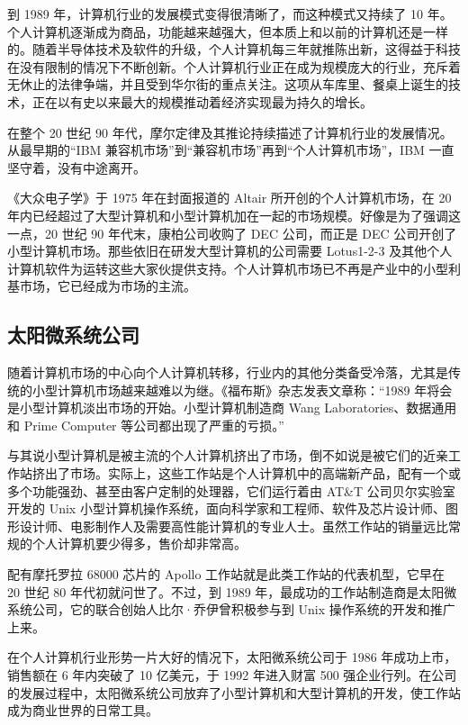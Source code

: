\documentclass[12pt,UTF8]{ctexbook}
\begin{document}
到 1989 年，计算机行业的发展模式变得很清晰了，而这种模式又持续了 10 年。个人计算机逐渐成为商品，功能越来越强大，但本质上和以前的计算机还是一样的。随着半导体技术及软件的升级，个人计算机每三年就推陈出新，这得益于科技在没有限制的情况下不断创新。个人计算机行业正在成为规模庞大的行业，充斥着无休止的法律争端，并且受到华尔街的重点关注。这项从车库里、餐桌上诞生的技术，正在以有史以来最大的规模推动着经济实现最为持久的增长。

在整个 20 世纪 90 年代，摩尔定律及其推论持续描述了计算机行业的发展情况。从最早期的“IBM 兼容机市场”到“兼容机市场”再到“个人计算机市场”，IBM 一直坚守着，没有中途离开。

《大众电子学》于 1975 年在封面报道的 Altair 所开创的个人计算机市场，在 20 年内已经超过了大型计算机和小型计算机加在一起的市场规模。好像是为了强调这一点，20 世纪 90 年代末，康柏公司收购了 DEC 公司，而正是 DEC 公司开创了小型计算机市场。那些依旧在研发大型计算机的公司需要 Lotus1-2-3 及其他个人计算机软件为运转这些大家伙提供支持。个人计算机市场已不再是产业中的小型利基市场，它已经成为市场的主流。





\subsection{太阳微系统公司}


随着计算机市场的中心向个人计算机转移，行业内的其他分类备受冷落，尤其是传统的小型计算机市场越来越难以为继。《福布斯》杂志发表文章称：“1989 年将会是小型计算机淡出市场的开始。小型计算机制造商 Wang Laboratories、数据通用和 Prime Computer 等公司都出现了严重的亏损。”

与其说小型计算机是被主流的个人计算机挤出了市场，倒不如说是被它们的近亲工作站挤出了市场。实际上，这些工作站是个人计算机中的高端新产品，配有一个或多个功能强劲、甚至由客户定制的处理器，它们运行着由 AT\&T 公司贝尔实验室开发的 Unix 小型计算机操作系统，面向科学家和工程师、软件及芯片设计师、图形设计师、电影制作人及需要高性能计算机的专业人士。虽然工作站的销量远比常规的个人计算机要少得多，售价却非常高。

配有摩托罗拉 68000 芯片的 Apollo 工作站就是此类工作站的代表机型，它早在 20 世纪 80 年代初就问世了。不过，到 1989 年，最成功的工作站制造商是太阳微系统公司，它的联合创始人比尔·乔伊曾积极参与到 Unix 操作系统的开发和推广上来。

在个人计算机行业形势一片大好的情况下，太阳微系统公司于 1986 年成功上市，销售额在 6 年内突破了 10 亿美元，于 1992 年进入财富 500 强企业行列。在公司的发展过程中，太阳微系统公司放弃了小型计算机和大型计算机的开发，使工作站成为商业世界的日常工具。
\end{document}
